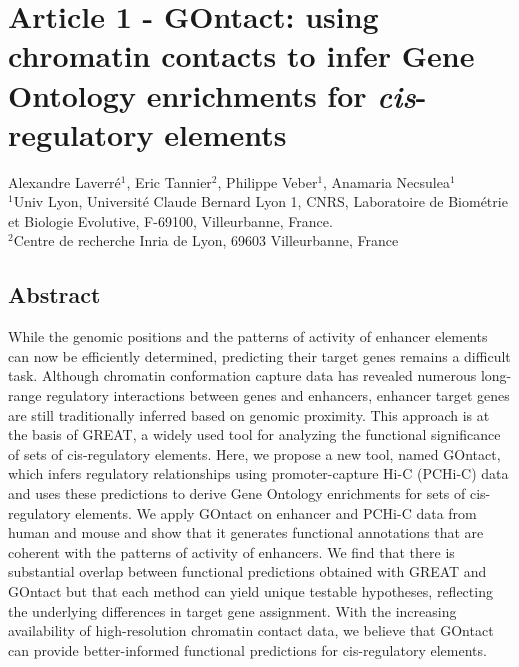 \chapter{Article 1 - GOntact: using chromatin contacts to infer Gene Ontology enrichments for \textit{cis}-regulatory elements}
\label{GOntact}

\begin{center}
 \large Alexandre Laverré$^{\text{1}}$, Eric Tannier$^{\text{2}}$, Philippe Veber$^{\text{1}}$, Anamaria Necsulea$^{\text{1}}$\\
 \vspace{0.5cm}
 \normalsize
 $^{\text{1}}$Univ Lyon, Université Claude Bernard Lyon 1, CNRS, Laboratoire de Biométrie et Biologie Evolutive, F-69100, Villeurbanne, France.\\
 $^{\text{2}}$Centre de recherche Inria de Lyon, 69603 Villeurbanne, France\\
\end{center}

{\hypersetup{linkcolor=GREYDARK}\minitoc}

\newpage
\section{Abstract}
While the genomic positions and the patterns of activity of enhancer elements can now be efficiently determined, predicting their target genes remains a difficult task. Although chromatin conformation capture data has revealed numerous long-range regulatory interactions between genes and enhancers, enhancer target genes are still traditionally inferred based on genomic proximity. This approach is at the basis of GREAT, a widely used tool for analyzing the functional significance of sets of \gls{cis}-regulatory elements. Here, we propose a new tool, named GOntact, which infers regulatory relationships using promoter-capture Hi-C (PCHi-C) data and uses these predictions to derive Gene Ontology enrichments for sets of \gls{cis}-regulatory elements. We apply GOntact on enhancer and PCHi-C data from human and mouse and show that it generates functional annotations that are coherent with the patterns of activity of enhancers. We find that there is substantial overlap between functional predictions obtained with GREAT and GOntact but that each method can yield unique testable hypotheses, reflecting the underlying differences in target gene assignment. With the increasing availability of high-resolution chromatin contact data, we believe that GOntact can provide better-informed functional predictions for \gls{cis}-regulatory elements.

